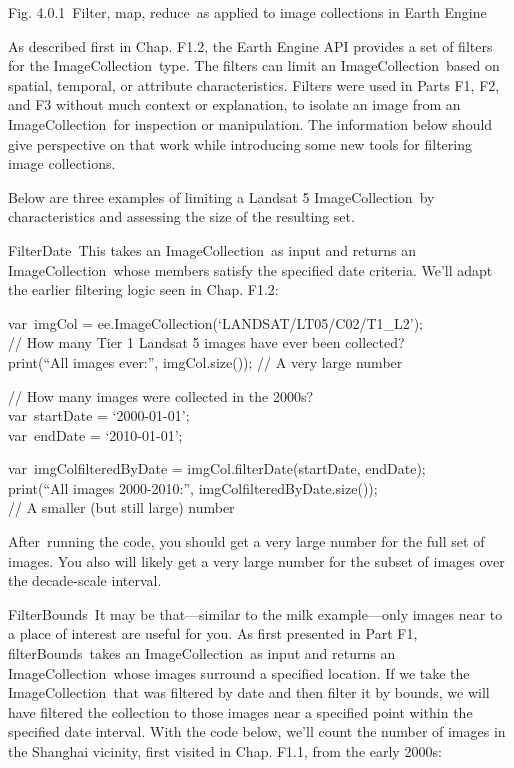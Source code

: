 \documentclass[
  letterpaper,
  DIV=11,
  numbers=noendperiod]{scrreprt}
\begin{document}
Fig. 4.0.1~Filter, map, reduce~as applied to image collections in Earth
Engine

As described first in Chap. F1.2, the Earth Engine API provides a set of
filters for the ImageCollection~type. The filters can limit an
ImageCollection~based on spatial, temporal, or attribute
characteristics. Filters were used in Parts F1, F2, and F3 without much
context or explanation, to isolate an image from an ImageCollection~for
inspection or manipulation. The information below should give
perspective on that work while introducing some new tools for filtering
image collections.

Below are three examples of limiting a Landsat 5 ImageCollection~by
characteristics and assessing the size of the resulting set.

FilterDate~This takes an ImageCollection~as input and returns an
ImageCollection~whose members satisfy the specified date criteria. We'll
adapt the earlier filtering logic seen in Chap. F1.2:

var~imgCol = ee.ImageCollection(`LANDSAT/LT05/C02/T1\_L2');\\
// How many Tier 1 Landsat 5 images have ever been collected?\\
print(``All images ever:'', imgCol.size()); // A very large number

// How many images were collected in the 2000s?\\
var~startDate = `2000-01-01';\\
var~endDate = `2010-01-01';

var~imgColfilteredByDate = imgCol.filterDate(startDate, endDate);\\
print(``All images 2000-2010:'', imgColfilteredByDate.size());\\
// A smaller (but still large) number

After~running the code, you should get a very large number for the full
set of images. You also will likely get a very large number for the
subset of images over the decade-scale interval. ~

FilterBounds~It may be that---similar to the milk example---only images
near to a place of interest are useful for you. As first presented in
Part F1, filterBounds~takes an ImageCollection~as input and returns an
ImageCollection~whose images surround a specified location. If we take
the ImageCollection~that was filtered by date and then filter it by
bounds, we will have filtered the collection to those images near a
specified point within the specified date interval. With the code below,
we'll count the number of images in the Shanghai vicinity, first visited
in Chap. F1.1, from the early 2000s:
\end{document}
